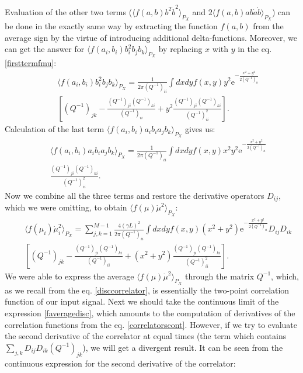 \documentclass{article}
\begin{document}
Evaluation of the other two terms ($\langle f(a,b)b^{2}\dot{b}^{2}\rangle_{P_{X}}$ and $2\langle f(a,b)a b \dot{a}\dot{b}\rangle_{P_{X}}$) can be done in the exactly same way by extracting the function $f(a,b)$ from the average sign by the virtue of introducing additional delta-functions. Moreover, we can get the answer for $\langle f(a_{i},b_{i})b_{i}^{2}b_{j}b_{k}\rangle_{P_{X}}$ by replacing $x$ with $y$ in the eq$.$ \eqref{firsttermfmu}: 
\begin{eqnarray}\label{secondtermfmu}
    &&\langle f(a_{i},b_{i})b_{i}^{2}b_{j}b_{k}\rangle_{P_{X}} = \frac{1}{2\pi(Q^{-1})_{ii}}\int dxdy f(x,y)y^{2}\textrm{e}^{-\frac{x^{2}+y^{2}}{2(Q^{-1})_{ii}}} \nonumber\\
    &&\left[(Q^{-1})_{jk}-\frac{(Q^{-1})_{ji}(Q^{-1})_{ki}}{(Q^{-1})_{ii}}+y^{2}\frac{(Q^{-1})_{ji}(Q^{-1})_{ki}}{(Q^{-1})_{ii}^{2}}\right].
\end{eqnarray}
Calculation of the last term $\langle f(a_{i},b_{i})a_{i}b_{i}a_{j}b_{k}\rangle_{P_{X}}$ gives us: 
\begin{eqnarray}\label{thirdtermfmu}
    &&\langle f(a_{i},b_{i})a_{i}b_{i}a_{j}b_{k}\rangle_{P_{X}} = \frac{1}{2\pi(Q^{-1})_{ii}}\int dxdy f(x,y)x^{2}y^{2}\textrm{e}^{-\frac{x^{2}+y^{2}}{2(Q^{-1})_{ii}}} \nonumber\\
    &&\frac{(Q^{-1})_{ji}(Q^{-1})_{ki}}{(Q^{-1})_{ii}^{2}}.
\end{eqnarray}
Now we combine all the three terms and restore the derivative operators $D_{ij}$, which we were omitting, to obtain $\langle f(\mu)\dot{\mu}^{2}\rangle_{P_{X}}$:
\begin{eqnarray}\label{faveragedisc}
    &&\langle f(\mu_{i}) \dot{\mu}_{i}^{2} \rangle_{P_{X}} = \sum_{j,k=1}^{M-1} \frac{4(\gamma L)^{2}}{2\pi (Q^{-1})_{ii}} \int dxdy f(x,y)(x^{2}+y^{2}) \textrm{e}^{-\frac{x^{2}+y^{2}}{2(Q^{-1})_{ii}}}D_{ij}D_{ik} \nonumber \\
    &&\left[(Q^{-1})_{jk}-\frac{(Q^{-1})_{ji}(Q^{-1})_{ki}}{(Q^{-1})_{ii}}+(x^{2}+y^{2})\frac{(Q^{-1})_{ji}(Q^{-1})_{ki}}{(Q^{-1})_{ii}^{2}}\right].       
\end{eqnarray}
We were able to express the average $\langle f(\mu)\dot{\mu}^{2}\rangle_{P_{X}}$ through the matrix $Q^{-1}$, which, as we recall from the eq$.$ \eqref{disccorrelator}, is essentially the two-point correlation function of our input signal. Next we should take the continuous limit of the expression \eqref{faveragedisc}, which amounts to the computation of derivatives of the correlation functions from the eq$.$ \eqref{correlatorscont}. However, if we try to evaluate the second derivative of the correlator at equal times (the term which contains $\sum_{j,k}D_{ij}D_{ik}(Q^{-1})_{jk}$), we will get a divergent result. It can be seen from the continuous expression for the second derivative of the correlator:
\end{document}

